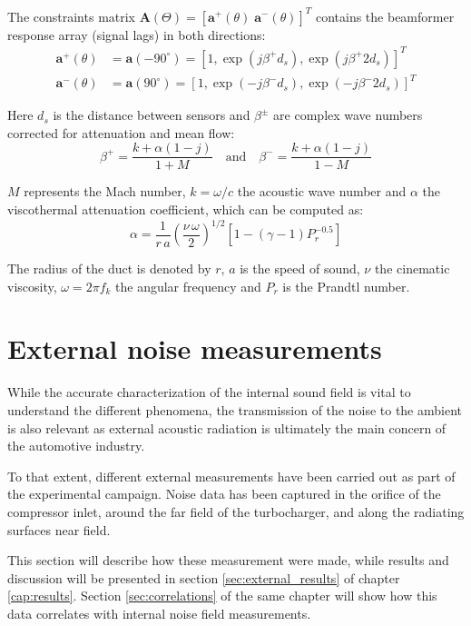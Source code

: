 The constraints matrix $\mathbf A(\Theta)=[\mathbf a^+(\theta)\; \mathbf a^-(\theta)]^T$ contains the beamformer response array (signal lags) in both directions:
\begin{align}
    \mathbf a^+(\theta) &= \mathbf a(-90^\circ)=\left[1,\exp(j\beta^+d_s),\exp(j\beta^+2d_s)\right]^T\\
    \mathbf a^-(\theta) &= \mathbf a(90^\circ)=\left[1,\exp(-j\beta^-d_s),\exp(-j\beta^-2d_s)\right]^T
\end{align}

Here $d_s$ is the distance between sensors and $\beta^\pm$ are complex wave numbers corrected for attenuation and mean flow:
\begin{equation}
    \beta^+=\frac{k+\alpha(1-j)}{1+M}\quad\text{and}\quad\beta^-=\frac{k+\alpha(1-j)}{1-M}
\end{equation}

$M$ represents the Mach number, $k=\omega/c$ the acoustic wave number and $\alpha$ the viscothermal attenuation coefficient, which can be computed as:
\begin{equation}
  \alpha=\frac{1}{r\,a}\left(\frac{\nu\,\omega}{2}\right)^{1/2}\left[1-(\gamma-1)P_r^{-0.5}\right]
\end{equation}

The radius of the duct is denoted by $r$, $a$ is the speed of sound, $\nu$ the cinematic viscosity, $\omega=2\pi f_k$ the angular frequency and $P_r$ is the Prandtl number.

\section{External noise measurements}

While the accurate characterization of the internal sound field is vital to understand the different phenomena, the transmission of the noise to the ambient is also relevant as external acoustic radiation is ultimately the main concern of the automotive industry.

To that extent, different external measurements have been carried out as part of the experimental campaign. Noise data has been captured in the orifice of the compressor inlet, around the far field of the turbocharger, and along the radiating surfaces near field.

This section will describe how these measurement were made, while results and discussion will be presented in section \ref{sec:external_results} of chapter \ref{cap:results}. Section \ref{sec:correlations} of the same chapter will show how this data correlates with internal noise field measurements.


